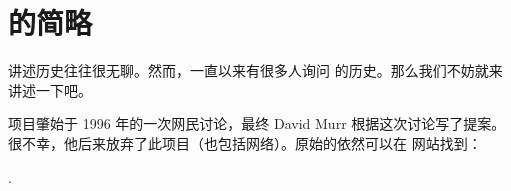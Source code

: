 \section{\FlightGear{} 的简略}
\fi
\iffalse
\IfLanguageName{english}{
\section{A Sketch on the \Index{History} of \FlightGear{}}
}{}
\IfLanguageName{french}{
\section{Une \'{e}bauche de l'\Index{histoire} de \FlightGear{}}
}{}
\fi
\ifchinese
讲述历史往往很无聊。然而，一直以来有很多人询问 \FlightGear{} 的历史。那么我们不妨就来讲述一下吧。

\FlightGear{} 项目肇始于 1996 年的一次网民讨论，最终 David Murr 根据这次讨论写了提案。很不幸，他后来放弃了此项目（也包括网络）。原始的依然可以在 \FlightGear{} 网站找到：

\fi
\iffalse
\IfLanguageName{english}{
History may be a boring subject. However, from time to time there are people asking for the history of \FlightGear{}. As a result, we'll give a short outline.

The \FlightGear{} project goes back to a discussion among a group of net citizens in 1996 resulting in a proposal written by David Murr\index{Murr, David} who, unfortunately, dropped out of the project (as well as the net) later. The original \Index{proposal} is still available
from the \FlightGear{} web site and can be found under
}{}
\IfLanguageName{french}{
L'histoire peut rapidement devenir un sujet barbant. Cependant, de temps en temps il y a des personnes qui s'int\'{e}ressent \`{a} l'histoire de \FlightGear{}. En cons\'{e}quence, nous allons en dresser un aper\c{c}u rapide.

A l'origine, le projet \FlightGear{} remonte \`{a} une discussion entre un groupe de citoyens du net en 1996 qui a eu pour r\'{e}sultat l'\'{e}criture d'une proposition par David Murr\index{Murr, David} qui, malheureusement, a quitt\'{e} le projet (ainsi que le net) plus tard. La \Index{proposition} d'origine est toujours disponible
\`{a} partir du site Internet de \FlightGear{} \`{a} l'adresse :
}{}
\fi

 \medskip

.
 \medskip

